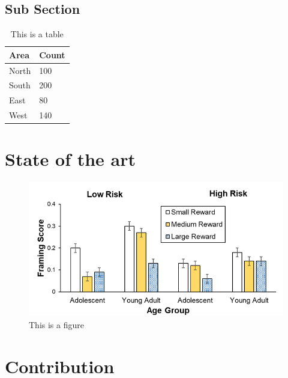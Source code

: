 \documentclass{silreport}
\begin{document}
\section{Sub Section}
\lipsum[1]

\begin{table}[hbt]
\centering
\begin{tabular}{ll}
\hline
Area & Count\\
\hline
North & 100\\
South & 200\\
East & 80\\
West & 140\\
\hline
\end{tabular}
\caption{This is a table}
\label{tab:sample}
\end{table}
\lipsum[1-2]

\chapter{State of the art}
\lipsum[1-2]

\begin{figure}[htp]
\centering
\includegraphics[width=.5\textwidth]{figures/sample_figure.jpg}
\caption{This is a figure}
\label{fig:samplefigure}
\end{figure}

\lipsum[1-2]


\chapter{Contribution}
\lipsum[1-2]
\end{document}
